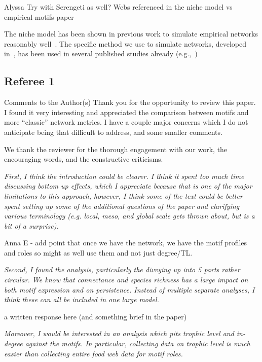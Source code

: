 \documentclass[12pt]{article}
\newcommand{\us}{\rm \setlength{\leftskip}{0.3cm} \setlength{\rightskip}{0.3cm}}
\newcommand{\them}{\it \setlength{\leftskip}{0cm} \setlength{\rightskip}{0cm}}
\begin{document}
\us
Alyssa
Try with Serengeti as well?
Webs referenced in the niche model vs empirical motifs paper

The niche model has been shown in previous work to simulate empirical networks reasonably well~\citep{Stouffer2005a,Stouffer2006}.
The specific method we use to simulate networks, developed in~\citet{Delmas2017}, has been used in several published studies already (e.g.,~\citep{})



\subsection*{Referee 1}

Comments to the Author(s)
Thank you for the opportunity to review this paper. I found it very interesting and appreciated the comparison between motifs and more “classic” network metrics. I have a couple major concerns which I do not anticipate being that difficult to address, and some smaller comments.

\us
We thank the reviewer for the thorough engagement with our work, the encouraging words, and the constructive criticisms. 

\them
First, I think the introduction could be clearer. I think it spent too much time discussing bottom up effects, which I appreciate because that is one of the major limitations to this approach, however, I think some of the text could be better spent setting up some of the additional questions of the paper and clarifying various terminology (e.g. local, meso, and global scale gets thrown about, but is a bit of a surprise).

\us
Anna E
- add point that once we have the network, we have the motif profiles and roles so might as well use them and not just degree/TL.

\them
Second, I found the analysis, particularly the divvying up into 5 parts rather circular. We know that connectance and species richness has a large impact on both motif expression and on persistence. Instead of multiple separate analyses, I think these can all be included in one large model. 

\us
a written response here (and something brief in the paper)

\them
Moreover, I would be interested in an analysis which pits trophic level and in-degree against the motifs. In particular, collecting data on trophic level is much easier than collecting entire food web data for motif roles.
\end{document}
